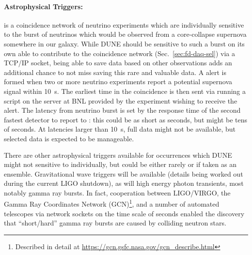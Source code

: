\paragraph{Astrophysical Triggers:}  is a coincidence
network of neutrino experiments which are individually sensitive to
the burst of neutrinos which would be observed from a core-collapse
supernova somewhere in our galaxy.
While DUNE should be sensitive to such a burst on its own able to
contribute to the coincidence network (Sec.~\ref{sec:fd-daq-sel}) via
a TCP/IP socket, being able to save data based on other observations
adds an additional chance to not miss saving this rare and valuable
data.
A  alert is formed when two or more neutrino experiments
report a potential supernova signal within \SI{10}{\s}.
The earliest time in the coincidence is then sent via running a script
on the  server at BNL provided by the experiment wishing
to receive the alert.
The latency from neutrino burst is set by the response time of the
second fastest detector to report to : this could be as
short as seconds, but might be tens of seconds.
At latencies larger than \SI{10}{\s}, full data might not be
available, but selected data is expected to be manageable.

There are other astrophysical triggers available for occurrences which
DUNE might not sensitive to individually, but could be either rarely
or if taken as an ensemble.
Gravitational wave triggers will be available (details being worked
out during the current LIGO shutdown), as will high energy photon
transients, most notably gamma ray bursts.
In fact, cooperation between LIGO/VIRGO, the Gamma Ray Coordinates
Network (GCN)\footnote{Described in detail at
  \url{https://gcn.gsfc.nasa.gov/gcn_describe.html}}, and a number of
automated telescopes via network sockets on the time scale of seconds
enabled the discovery that ``short/hard'' gamma ray bursts are caused
by colliding neutron stars\cite{kilonova}.
